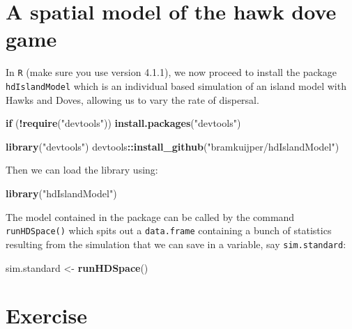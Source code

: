 \documentclass[
]{book}
\newenvironment{Shaded}{\begin{snugshade}}{\end{snugshade}}
\newcommand{\ControlFlowTok}[1]{\textcolor[rgb]{0.13,0.29,0.53}{\textbf{#1}}}
\newcommand{\FunctionTok}[1]{\textcolor[rgb]{0.13,0.29,0.53}{\textbf{#1}}}
\newcommand{\NormalTok}[1]{#1}
\newcommand{\OtherTok}[1]{\textcolor[rgb]{0.56,0.35,0.01}{#1}}
\newcommand{\SpecialCharTok}[1]{\textcolor[rgb]{0.81,0.36,0.00}{\textbf{#1}}}
\newcommand{\StringTok}[1]{\textcolor[rgb]{0.31,0.60,0.02}{#1}}
\begin{document}
\section{A spatial model of the hawk dove game}\label{a-spatial-model-of-the-hawk-dove-game}

In \texttt{R} (make sure you use version 4.1.1), we now proceed to install the package \texttt{hdIslandModel} which is an individual based simulation of an island model with Hawks and Doves, allowing us to vary the rate of dispersal.

\begin{Shaded}
\begin{Highlighting}[]
\ControlFlowTok{if}\NormalTok{ (}\SpecialCharTok{!}\FunctionTok{require}\NormalTok{(}\StringTok{"devtools"}\NormalTok{)) }\FunctionTok{install.packages}\NormalTok{(}\StringTok{"devtools"}\NormalTok{)}

\FunctionTok{library}\NormalTok{(}\StringTok{"devtools"}\NormalTok{)}
\NormalTok{devtools}\SpecialCharTok{::}\FunctionTok{install\_github}\NormalTok{(}\StringTok{"bramkuijper/hdIslandModel"}\NormalTok{)}
\end{Highlighting}
\end{Shaded}

Then we can load the library using:

\begin{Shaded}
\begin{Highlighting}[]
\FunctionTok{library}\NormalTok{(}\StringTok{"hdIslandModel"}\NormalTok{)}
\end{Highlighting}
\end{Shaded}

The model contained in the package can be called by the command \texttt{runHDSpace()} which spits out a \texttt{data.frame} containing a bunch of statistics resulting from the simulation that we can save in a variable, say \texttt{sim.standard}:

\begin{Shaded}
\begin{Highlighting}[]
\NormalTok{sim.standard }\OtherTok{\textless{}{-}} \FunctionTok{runHDSpace}\NormalTok{() }
\end{Highlighting}
\end{Shaded}

\section{Exercise}\label{exercise-8}
\end{document}
